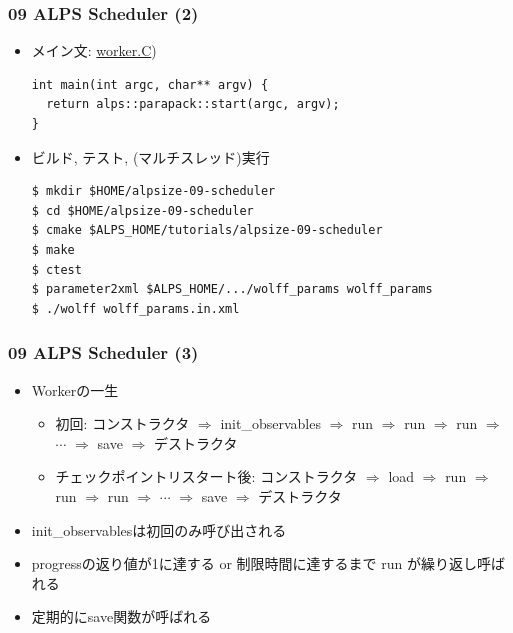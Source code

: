\begin{frame}[fragile]
  \frametitle{09 ALPS Scheduler (2)}
  \begin{itemize}
    \item メイン文: \href{https://github.com/cmsi/alps-tutorial/blob/develop/alpsize/09-wolff.C}{worker.C})
\begin{lstlisting}
int main(int argc, char** argv) {
  return alps::parapack::start(argc, argv);
}
\end{lstlisting}
    \item ビルド, テスト, (マルチスレッド)実行
\begin{lstlisting}
$ mkdir $HOME/alpsize-09-scheduler
$ cd $HOME/alpsize-09-scheduler
$ cmake $ALPS_HOME/tutorials/alpsize-09-scheduler
$ make
$ ctest
$ parameter2xml $ALPS_HOME/.../wolff_params wolff_params
$ ./wolff wolff_params.in.xml
\end{lstlisting}
  \end{itemize}
\end{frame}

\begin{frame}[fragile]
  \frametitle{09 ALPS Scheduler (3)}
  \begin{itemize}
    \item Workerの一生
      \begin{itemize}
        \item 初回: コンストラクタ $\Rightarrow$ {\color{red} init\_observables} $\Rightarrow$ run $\Rightarrow$ run $\Rightarrow$ run  $\Rightarrow$ $\cdots$ $\Rightarrow$ save $\Rightarrow$ デストラクタ
        \item チェックポイントリスタート後: コンストラクタ $\Rightarrow$ {\color{red} load} $\Rightarrow$ run $\Rightarrow$ run $\Rightarrow$ run  $\Rightarrow$ $\cdots$ $\Rightarrow$ save  $\Rightarrow$ デストラクタ
      \end{itemize}
      \item init\_observablesは初回のみ呼び出される
      \item progressの返り値が1に達する or 制限時間に達するまで run が繰り返し呼ばれる
      \item 定期的にsave関数が呼ばれる
  \end{itemize}
\end{frame}

